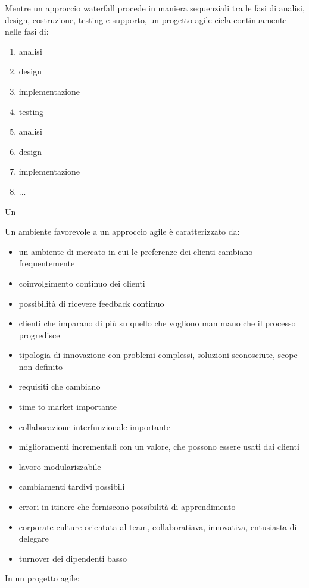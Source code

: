 \documentclass[answers, a4paper, 11pt]{exam}
\begin{document}
Mentre un approccio waterfall procede in maniera sequenziali tra le fasi di analisi, design, costruzione, testing e supporto, un progetto agile cicla continuamente nelle fasi di:

\begin{enumerate}
    \item analisi
    \item design
    \item implementazione
    \item testing
    \item analisi
    \item design
    \item implementazione
    \item ...
\end{enumerate}

Un 

Un ambiente favorevole a un approccio agile è caratterizzato da:

\begin{itemize}
    \item un ambiente di mercato in cui le preferenze dei clienti cambiano frequentemente
    \item coinvolgimento continuo dei clienti
    \item possibilità di ricevere feedback continuo
    \item clienti che imparano di più su quello che vogliono man mano che il processo progredisce
    \item tipologia di innovazione con problemi complessi, soluzioni sconosciute, scope non definito
    \item requisiti che cambiano
    \item time to market importante
    \item collaborazione interfunzionale importante
    \item miglioramenti incrementali con un valore, che possono essere usati dai clienti
    \item lavoro modularizzabile
    \item cambiamenti tardivi possibili
    \item errori in itinere che forniscono possibilità di apprendimento
    \item corporate culture orientata al team, collaboratiava, innovativa, entusiasta di delegare
    \item turnover dei dipendenti basso
\end{itemize}


In un progetto agile: 
\end{document}
